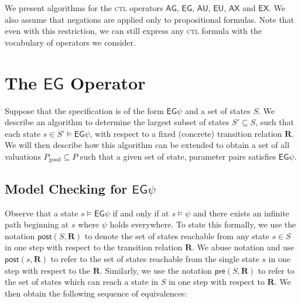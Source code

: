 \documentclass[10pt]{article}
\newcommand{\ctl}{\textsc{ctl}\xspace}
\newcommand{\ctrans}{\ensuremath{\mathbf{R}}\xspace}
\newcommand{\ag}[1]{\ensuremath{\mathsf{AG}#1\xspace}}
\newcommand{\eg}[1]{\ensuremath{\mathsf{EG}#1\xspace}}
\newcommand{\ax}[1]{\ensuremath{\mathsf{AX}#1\xspace}}
\newcommand{\ex}[1]{\ensuremath{\mathsf{EX}#1\xspace}}
\newcommand{\au}[2]{\ensuremath{\mathsf{A}#1 \mathsf{U} #2\xspace}}
\newcommand{\eu}[2]{\ensuremath{\mathsf{E}#1 \mathsf{U} #2\xspace}}
\newcommand{\pgood}{\ensuremath{P_{\mathrm{good}}}\xspace}
\newcommand{\post}[2]{\ensuremath{\mathsf{post}(#1, #2)}\xspace}
\newcommand{\pre}[2]{\ensuremath{\mathsf{pre}(#1, #2)}\xspace}
\begin{document}
\begin{spacing}{1}
We present algorithms for the \ctl operators \ag{}, \eg{}, \au{}{},
\eu{}{}, \ax{} and \ex{}. We also assume that negations are applied only to
propositional formulas. Note that even with this restriction, we can still
express any \ctl formula with the vocabulary of operators we consider.

\section{The \eg{} Operator}
Suppose that the specification is of the form \eg{\psi} and a set of
states $S$. We describe an algorithm to determine the largest subset
of states $S' \subseteq S$, such that each state $s \in S' \models
\eg{\psi}$, with respect to a fixed (concrete) transition relation
$\ctrans$. We will then describe how this algorithm can be extended to
obtain a set of all valuations $\pgood \subseteq P$ such that a given
set of state, parameter pairs satisfies \eg{\psi}.

\subsection{Model Checking for $\eg{\psi}$}
Observe that a state $s \models \eg{\psi}$ if and only if at
$s \models \psi$ and there exists an infinite path
beginning at $s$ where $\psi$ holds everywhere. To state this formally, we
use the notation $\post{S}{\ctrans}$ to denote the set of states reachable
from any state $s \in S$ in one step with respect to the transition
relation \ctrans. We abuse notation and use $\post{s}{\ctrans}$ to refer to
the set of states reachable from the single state $s$ in one step with
respect to the \ctrans. Similarly, we use the notation $\pre{S}{\ctrans}$
to refer to the set of states which can reach a state in $S$ in one step
with respect to $\ctrans$. We then obtain the following sequence of
equivalences:


\end{spacing}
\end{document}
